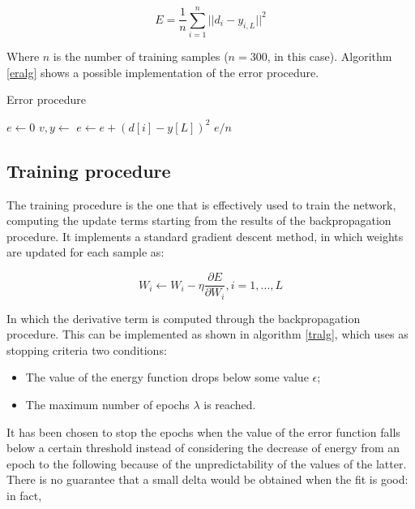 \documentclass[letterpaper,headings=standardclasses]{scrartcl}
\begin{document}
$$ E = \frac{1}{n} \sum_{i = 1}^{n} || d_i - y_{i,L} ||^2 $$

Where $n$ is the number of training samples ($n = 300$, in this case). Algorithm \ref{eralg} shows a possible implementation of the error procedure.

\begin{algorithm}[h]
    \caption{Error procedure}
    \label{eralg}
    \begin{algorithmic}
    
        \State $e \gets 0$
            \State $v, y \gets $ 
            \State $e \gets e + (d[i] - y[L])^2$
        \EndFor
        \State \Return $e / n$
    \EndFunction
    
    \end{algorithmic}
\end{algorithm}

\subsection{Training procedure}

The training procedure is the one that is effectively used to train the network, computing the update terms starting from the results of the backpropagation procedure. It implements a standard gradient descent method, in which weights are updated for each sample as:

$$ W_i \leftarrow W_i - \eta \frac{\partial E}{\partial W_i}, i = 1, \dots, L $$

In which the derivative term is computed through the backpropagation procedure. This can be implemented as shown in algorithm \ref{tralg}, which uses as stopping criteria two conditions:

\begin{itemize}
    \item The value of the energy function drops below some value $\epsilon$;
    \item The maximum number of epochs $\lambda$ is reached.
\end{itemize}

It has been chosen to stop the epochs when the value of the error function falls below a certain threshold instead of considering the decrease of energy from an epoch to the following because of the unpredictability of the values of the latter. There is no guarantee that a small delta would be obtained when the fit is good: in fact, 
\end{document}
